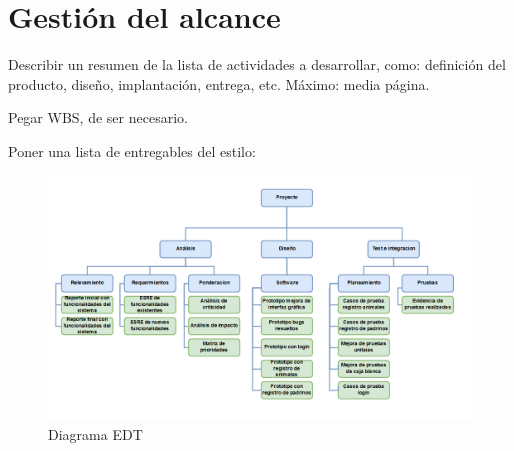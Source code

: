 \section{Gestión del alcance}
Describir un resumen de la lista de actividades a desarrollar, como: definición del producto, diseño, implantación, entrega, etc.
Máximo: media página. 

Pegar WBS, de ser necesario.

Poner una lista de entregables del estilo:


\begin{figure}[H]
    \centering
    \includegraphics[scale=0.3]{Files/edtv1.png}
    \caption{Diagrama EDT}
    \label{fig:clases}
\end{figure}
